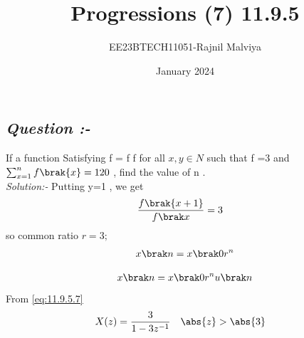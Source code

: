 \documentclass[journal,12pt,twocolumn]{IEEEtran}
\theoremstyle{remark}
\begin{document}
\title{Progressions (7) 11.9.5}
\author{EE23BTECH11051-Rajnil Malviya}
\date{January 2024}
\maketitle
\subsection*{\textit{Question :-}}
If a function Satisfying f = f f for all $x,y \in {N}$ such that f =3 and $\sum_{x=1}^{n} f\brak{x} = 120$ , find the value of n .\\
\textit{Solution:- }
Putting y=1 , we get
\begin{align}
    \frac{f\brak{x+1}}{f\brak x}&=3
\end{align}
so common ratio $r=3 ;$
\begin{align}
    x \brak n = x \brak 0r^{n}
\end{align}

\begin{table}[h!]
            
    \end{table}
\begin{align}
x \brak n = x \brak 0r^{n}u\brak n
\label{eq:11.9.5.7}
\end{align}
From \eqref{eq:11.9.5.7}
\begin{align}
X(z) &=\frac{3}{1-3z^{-1}} \quad \abs{z} > \abs{3}
\end{align}
\end{document}
